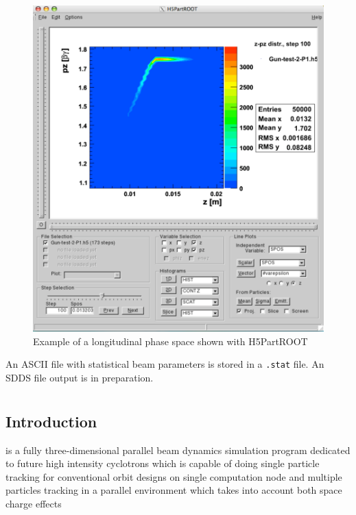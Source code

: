 \begin{figure}[ht]
 \begin{center}
   \includegraphics[width=.9\linewidth,angle=0]{figures/H5rootPicture3}
  \caption{Example of a longitudinal phase space shown with H5PartROOT}
  \label{fig:h5root2}
 \end{center}
\end{figure}



An ASCII file with statistical beam 
parameters is stored in a {\tt .stat} file. An SDDS file output is in preparation.

\section{\opalcycl}
\label{sec:opalcycl}

\subsection{Introduction}

\opalcycl is a fully three-dimensional parallel beam dynamics simulation program dedicated to future high intensity cyclotrons 
which is capable of doing single particle tracking for conventional orbit designs on single computation node and 
multiple particles tracking in a parallel environment which takes into account both space charge effects 
 
